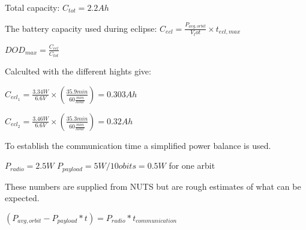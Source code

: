 \vspace{5 mm}Total capacity: $C_{tot} = 2.2 Ah$

The battery capacity used during eclipse: $C_{ecl} = \frac{P_{avg,orbit}}{V_tot}\times t_{ecl,max}$

 $DOD_{max} = \frac{C_{ecl}}{C_{tot}}$

\vspace{5 mm}Calculted with the different hights give:

\vspace{5 mm}$C_{ecl_1} = \frac{3.34W}{6.6V}\times(\frac{35.9min}{60\frac{min}{hour}}) = 0.303 Ah$

$C_{ecl_2} = \frac{3.46W}{6.6V}\times(\frac{35.3min}{60\frac{min}{hour}}) = 0.32 Ah$


To establish the communication time a simplified power balance is used. 

$P_{radio} = 2.5 W$
$P_{payload} = 5 W / 10 obits = 0.5 W$ for one arbit

These numbers are supplied from NUTS but are rough estimates of what can be expected.

$(P_{avg,orbit} - P_{payload}*t)= P_{radio}*t_{communication}$













